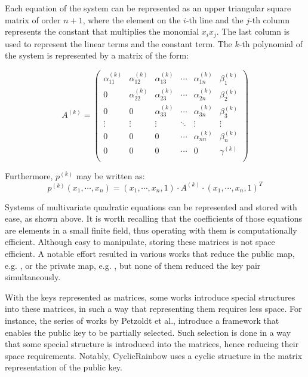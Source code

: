 \documentclass{ufsctex/ufsctex}
\begin{document}
Each equation of the system can be represented as an upper triangular square
matrix of order $n+1$, where the element on the $i$-th line and the $j$-th
column represents the constant that multiplies the monomial $x_i x_j$. The last
column is used to represent the linear terms and the constant term. The $k$-th
polynomial of the system is represented by a matrix of the form:

\begin{equation}\label{eq:matrixrepresentation}
A^{(k)} =
\begin{pmatrix}
\alpha^{(k)}_{11} & \alpha^{(k)}_{12} & \alpha^{(k)}_{13} & \cdots &
	\alpha^{(k)}_{1n} & \beta^{(k)}_1 \\
0 & \alpha^{(k)}_{22} & \alpha^{(k)}_{23} & \cdots &
	\alpha^{(k)}_{2n} & \beta^{(k)}_2 \\
0 & 0 & \alpha^{(k)}_{33} & \cdots &
	\alpha^{(k)}_{3n} & \beta^{(k)}_3 \\
\vdots & \vdots & \vdots & \ddots & \vdots & \vdots \\
0 & 0 & 0 & \cdots & \alpha^{(k)}_{nn} & \beta^{(k)}_n \\
0 & 0 & 0 & \cdots & 0 & \gamma^{(k)} \\
\end{pmatrix}
\end{equation}

Furthermore, $p^{(k)}$ may be written as:
\begin{equation}
p^{(k)}(x_1,\cdots,x_n) =
	(x_1,\cdots,x_n,1) \cdot A^{(k)} \cdot (x_1,\cdots,x_n,1)^T
\end{equation}

Systems of multivariate quadratic equations can be represented and stored with
ease, as shown above. It is worth recalling that the coefficients of those
equations are elements in a small finite field, thus operating with them is
computationally efficient. Although easy to manipulate, storing these matrices
is not space efficient. A notable effort resulted in various works that reduce
the public map, e.g. \cite{petzoldt2010cyclicrainbow}, or the private map, e.g.
\cite{yasuda2012reducing}, but none of them reduced the key pair
simultaneously.

With the keys represented as matrices, some works introduce special structures
into these matrices, in such a way that representing them requires less space.
For instance, the series of works by Petzoldt et al., introduce a framework
that enables the public key to be partially selected. Such selection is done in
a way that some special structure is introduced into the matrices, hence
reducing their space requirements. Notably, CyclicRainbow uses a cyclic
structure in the matrix representation of the public key.
\end{document}
